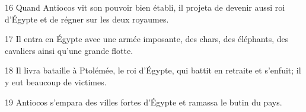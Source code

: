 16 Quand Antiocos vit son pouvoir bien établi, il projeta de devenir aussi roi d’Égypte et de régner sur les deux royaumes.

17 Il entra en Égypte avec une armée imposante, des chars, des éléphants, des cavaliers ainsi qu’une grande flotte.

18 Il livra bataille à Ptolémée, le roi d’Égypte, qui battit en retraite et s’enfuit; il y eut beaucoup de victimes.

19 Antiocos s’empara des villes fortes d’Égypte et ramassa le butin du pays.
